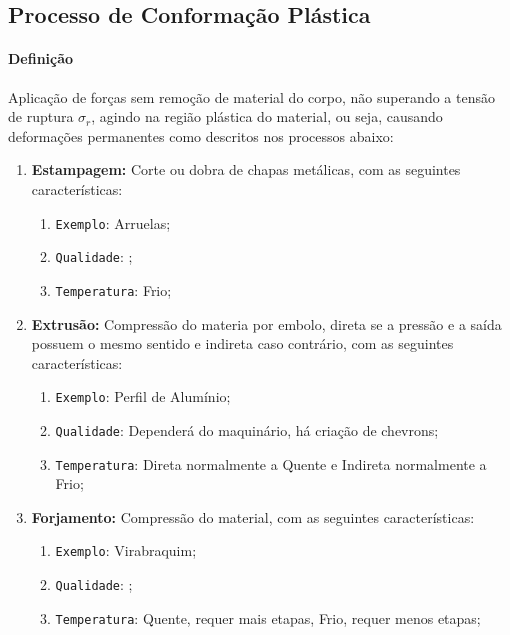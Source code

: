 \documentclass{article}
\begin{document}
        \subsection{Processo de Conformação Plástica}
            \paragraph{Definição}Aplicação de forças sem remoção de material do corpo, não superando a tensão de ruptura $\sigma_{r}$, agindo na região plástica do material, ou seja, causando deformações permanentes como descritos nos processos abaixo:
                \begin{enumerate}[rightmargin = \leftmargin]
                    \item \textbf{Estampagem:} Corte ou dobra de chapas metálicas, com as seguintes características:
                        \begin{enumerate}[rightmargin = \leftmargin, noitemsep]
                            \item \texttt{Exemplo}: Arruelas;
                            \item \texttt{Qualidade}: ;
                            \item \texttt{Temperatura}: Frio;
                        \end{enumerate}

                    \item \textbf{Extrusão:} Compressão do materia por embolo, direta se a pressão e a saída possuem o mesmo sentido e indireta caso contrário, com as seguintes características:
                        \begin{enumerate}[rightmargin = \leftmargin, noitemsep]
                            \item \texttt{Exemplo}: Perfil de Alumínio;
                            \item \texttt{Qualidade}: Dependerá do maquinário, há criação de chevrons;
                            \item \texttt{Temperatura}: Direta normalmente a Quente e Indireta normalmente a Frio;
                        \end{enumerate}

                    \item \textbf{Forjamento:} Compressão do material, com as seguintes características:
                        \begin{enumerate}[rightmargin = \leftmargin, noitemsep]
                            \item \texttt{Exemplo}: Virabraquim;
                            \item \texttt{Qualidade}: ;
                            \item \texttt{Temperatura}: Quente, requer mais etapas, Frio, requer menos etapas;
                        \end{enumerate}


\end{enumerate}
\end{document}
